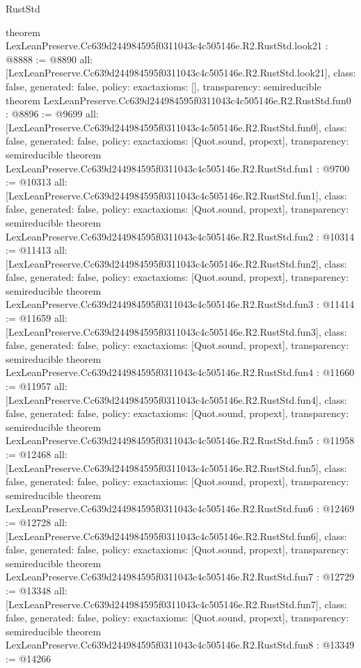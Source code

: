 \begin{lexlean}{RustStd}
\begin{coremodule}
{}
theorem LexLeanPreserve.Cc639d244984595f0311043c4c505146e.R2.RustStd.look21 : @8888 := @8890 {
  all: [LexLeanPreserve.Cc639d244984595f0311043c4c505146e.R2.RustStd.look21],
  class: false,
  generated: false,
  policy: exact{axioms: []},
  transparency: semireducible
}
theorem LexLeanPreserve.Cc639d244984595f0311043c4c505146e.R2.RustStd.fun0 : @8896 := @9699 {
  all: [LexLeanPreserve.Cc639d244984595f0311043c4c505146e.R2.RustStd.fun0],
  class: false,
  generated: false,
  policy: exact{axioms: [Quot.sound, propext]},
  transparency: semireducible
}
theorem LexLeanPreserve.Cc639d244984595f0311043c4c505146e.R2.RustStd.fun1 : @9700 := @10313 {
  all: [LexLeanPreserve.Cc639d244984595f0311043c4c505146e.R2.RustStd.fun1],
  class: false,
  generated: false,
  policy: exact{axioms: [Quot.sound, propext]},
  transparency: semireducible
}
theorem LexLeanPreserve.Cc639d244984595f0311043c4c505146e.R2.RustStd.fun2 : @10314 := @11413 {
  all: [LexLeanPreserve.Cc639d244984595f0311043c4c505146e.R2.RustStd.fun2],
  class: false,
  generated: false,
  policy: exact{axioms: [Quot.sound, propext]},
  transparency: semireducible
}
theorem LexLeanPreserve.Cc639d244984595f0311043c4c505146e.R2.RustStd.fun3 : @11414 := @11659 {
  all: [LexLeanPreserve.Cc639d244984595f0311043c4c505146e.R2.RustStd.fun3],
  class: false,
  generated: false,
  policy: exact{axioms: [Quot.sound, propext]},
  transparency: semireducible
}
theorem LexLeanPreserve.Cc639d244984595f0311043c4c505146e.R2.RustStd.fun4 : @11660 := @11957 {
  all: [LexLeanPreserve.Cc639d244984595f0311043c4c505146e.R2.RustStd.fun4],
  class: false,
  generated: false,
  policy: exact{axioms: [Quot.sound, propext]},
  transparency: semireducible
}
theorem LexLeanPreserve.Cc639d244984595f0311043c4c505146e.R2.RustStd.fun5 : @11958 := @12468 {
  all: [LexLeanPreserve.Cc639d244984595f0311043c4c505146e.R2.RustStd.fun5],
  class: false,
  generated: false,
  policy: exact{axioms: [Quot.sound, propext]},
  transparency: semireducible
}
theorem LexLeanPreserve.Cc639d244984595f0311043c4c505146e.R2.RustStd.fun6 : @12469 := @12728 {
  all: [LexLeanPreserve.Cc639d244984595f0311043c4c505146e.R2.RustStd.fun6],
  class: false,
  generated: false,
  policy: exact{axioms: [Quot.sound, propext]},
  transparency: semireducible
}
theorem LexLeanPreserve.Cc639d244984595f0311043c4c505146e.R2.RustStd.fun7 : @12729 := @13348 {
  all: [LexLeanPreserve.Cc639d244984595f0311043c4c505146e.R2.RustStd.fun7],
  class: false,
  generated: false,
  policy: exact{axioms: [Quot.sound, propext]},
  transparency: semireducible
}
theorem LexLeanPreserve.Cc639d244984595f0311043c4c505146e.R2.RustStd.fun8 : @13349 := @14266 {
}
\end{coremodule}
\end{lexlean}
